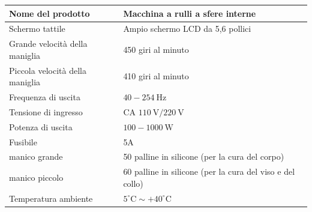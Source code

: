 \documentclass[a4paper]{article}
\begin{document}
\begin{table}[H]
\begin{center}
\begin{tabularx}{\textwidth}{|X|X|}
\hline
Nome del prodotto & Macchina a rulli a sfere interne \\
\hline
Schermo tattile & Ampio schermo LCD da 5,6 pollici \\
\hline
Grande velocità della maniglia & 450 giri al minuto \\
\hline
Piccola velocità della maniglia & 410 giri al minuto \\
\hline
Frequenza di uscita & $40-254 \mathrm{~Hz}$ \\
\hline
Tensione di ingresso & CA $110 \mathrm{~V} / 220 \mathrm{~V}$ \\
\hline
Potenza di uscita & $100-1000 \mathrm{~W}$ \\
\hline
Fusibile & 5A \\
\hline
manico grande & 50 palline in silicone (per la cura del corpo) \\
\hline
manico piccolo & 60 palline in silicone (per la cura del viso e del collo) \\
\hline
Temperatura ambiente & $5^{\circ} \mathrm{C} \sim+40^{\circ} \mathrm{C}$ \\
\hline
\end{tabularx}
\end{center}
\end{table}




\end{document}

